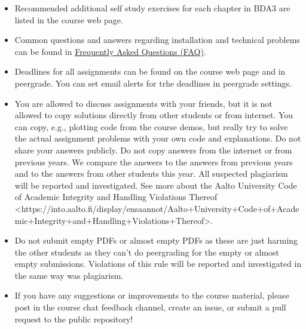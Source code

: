 \begin{itemize}
\item Recommended additional self study exercises for each chapter in BDA3 are listed in the course web page.
\item Common questions and answers regarding installation and technical problems can be found in \href{https://github.com/avehtari/BDA_course_Aalto/blob/master/FAQ.md}{Frequently Asked Questions (FAQ)}.
\item Deadlines for all assignments can be found on the course web page and in peergrade. You can set email alerts for trhe deadlines in peergrade settings.
\item You are allowed to discuss assignments with your friends, but it is not allowed to copy solutions directly from other students or from internet. You can copy, e.g., plotting code from the course demos, but really try to solve the actual assignment problems with your own code and explanations. Do not share your answers publicly. Do not copy answers from the internet or from previous years. We compare the answers to the answers from previous years and to the answers from other students this year. All suspected plagiarism will be reported and investigated. See more about the Aalto University Code of Academic Integrity and Handling Violations Thereof <https://into.aalto.fi/display/ensaannot/Aalto+University+Code+of+Academic+Integrity+and+Handling+Violations+Thereof>.
\item Do not submit empty PDFs or almost empty PDFs as these are just harming the other students as they can't do peergrading for the empty or almost empty submissions. Violations of this rule will be reported and investigated in the same way was plagiarism.
\item If you have any suggestions or improvements to the course material, please post in the course chat feedback channel, create an issue, or submit a pull request to the public repository!
\end{itemize}
